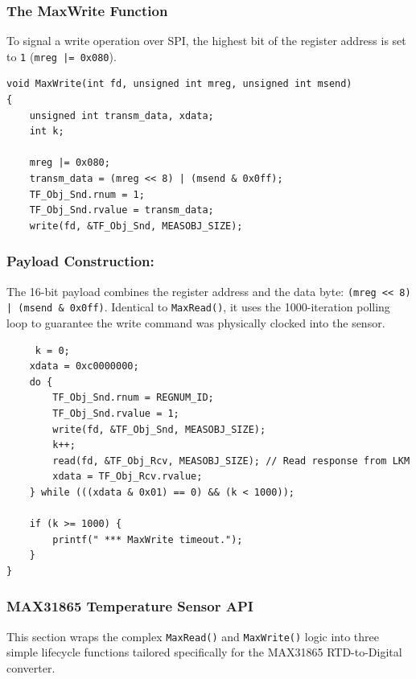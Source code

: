 \subsubsection{The MaxWrite Function}
To signal a write operation over SPI, the highest bit of the register
address is set to \texttt{1} (\texttt{mreg |= 0x080}).

\begin{verbatim}
void MaxWrite(int fd, unsigned int mreg, unsigned int msend)
{
    unsigned int transm_data, xdata;
    int k;

    mreg |= 0x080;
    transm_data = (mreg << 8) | (msend & 0x0ff);
    TF_Obj_Snd.rnum = 1;
    TF_Obj_Snd.rvalue = transm_data;
    write(fd, &TF_Obj_Snd, MEASOBJ_SIZE);
\end{verbatim}

\subsubsection*{Payload Construction: }
The 16-bit payload combines the register address and the data byte:
\texttt{(mreg << 8) | (msend \& 0x0ff)}. Identical to \texttt{MaxRead()},
it uses the 1000-iteration polling loop to guarantee the write command
was physically clocked into the sensor.

\begin{verbatim}
     k = 0;
    xdata = 0xc0000000;
    do {
        TF_Obj_Snd.rnum = REGNUM_ID;
        TF_Obj_Snd.rvalue = 1;
        write(fd, &TF_Obj_Snd, MEASOBJ_SIZE);
        k++;
        read(fd, &TF_Obj_Rcv, MEASOBJ_SIZE); // Read response from LKM
        xdata = TF_Obj_Rcv.rvalue;
    } while (((xdata & 0x01) == 0) && (k < 1000));
    
    if (k >= 1000) {
        printf(" *** MaxWrite timeout.");
    }
}
\end{verbatim}

\subsubsection*{MAX31865 Temperature Sensor API}
This section wraps the complex \texttt{MaxRead()} and \texttt{MaxWrite()}
logic into three simple lifecycle functions tailored specifically for the
MAX31865 RTD-to-Digital converter.

